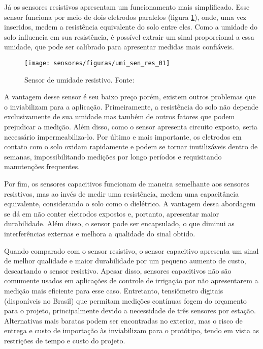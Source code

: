 	Já os sensores resistivos apresentam um funcionamento mais simplificado. Esse sensor funciona por meio de dois eletrodos paralelos (figura \ref{umi_sen_res_01}), onde, uma vez inseridos, medem a resistência equivalente do solo entre eles. Como a umidade do solo influencia em sua resistência, é possível extrair um sinal proporcional a essa umidade, que pode ser calibrado para apresentar medidas mais confiáveis.
	
	\begin{figure}[H]
		\centering
		\texttt{[image: sensores/figuras/umi\_sen\_res\_01]}
		\caption{Sensor de umidade resistivo. Fonte: \cite{bib_umi_sen_res_01}}
		\label{umi_sen_res_01}
	\end{figure}	
	
	A vantagem desse sensor é seu baixo preço porém, existem outros problemas que o inviabilizam para a aplicação. Primeiramente, a resistência do solo não depende exclusivamente de sua umidade mas também de outros fatores que podem prejudicar a medição. Além disso, como o sensor apresenta circuito exposto, seria necessário impermeabiliza-lo. Por último e mais importante, os eletrodos em contato com o solo oxidam rapidamente e podem se tornar inutilizáveis dentro de semanas, impossibilitando medições por longo períodos e requisitando manutenções frequentes.
	
	Por fim, os sensores capacitivos funcionam de maneira semelhante aos sensores resistivos, mas ao invés de medir uma resistência, medem uma capacitância equivalente, considerando o solo como o dielétrico. A vantagem dessa abordagem se dá em não conter eletrodos expostos e, portanto, apresentar maior durabilidade. Além disso, o sensor pode ser encapsulado, o que diminui as interferências externas e melhora a qualidade do sinal obtido.
	
	Quando comparado com o sensor resistivo, o sensor capacitivo apresenta um sinal de melhor qualidade e maior durabilidade por um pequeno aumento de custo, descartando o sensor resistivo. Apesar disso, sensores capacitivos não são comumente usados em aplicações de controle de irrigação por não apresentarem a medição mais eficiente para esse caso. Entretanto, tensiômetro digitais (disponíveis no Brasil) que permitam medições contínuas fogem do orçamento para o projeto, principalmente devido a necessidade de três sensores por estação. Alternativas mais baratas podem ser encontradas no exterior, mas o risco de entrega e custo de importação às inviabilizam para o protótipo, tendo em vista as restrições de tempo e custo do projeto.
	
